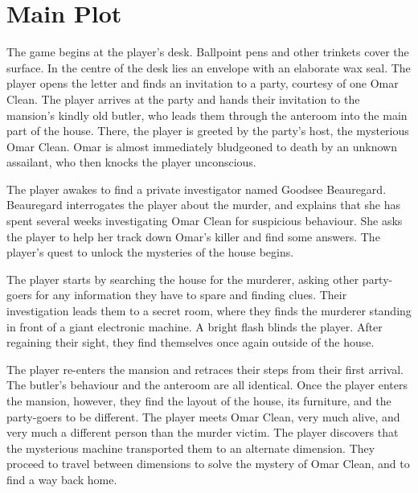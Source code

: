 \section{Main Plot}
\label{sec:mainplot}
The game begins at the player's desk. Ballpoint pens and other trinkets cover the surface. In the centre of the desk lies an envelope with an elaborate wax seal. The player opens the letter and finds an invitation to a party, courtesy of one Omar Clean. The player arrives at the party and hands their invitation to the mansion's kindly old butler, who leads them through the anteroom into the main part of the house. There, the player is greeted by the party's host, the mysterious Omar Clean. Omar is almost immediately bludgeoned to death by an unknown assailant, who then knocks the player unconscious.

The player awakes to find a private investigator named Goodsee Beauregard. Beauregard interrogates the player about the murder, and explains that she has spent several weeks investigating Omar Clean for suspicious behaviour. She asks the player to help her track down Omar's killer and find some answers. The player's quest to unlock the mysteries of the house begins.

The player starts by searching the house for the murderer, asking other party-goers for any information they have to spare and finding clues. Their investigation leads them to a secret room, where they finds the murderer standing in front of a giant electronic machine. A bright flash blinds the player. After regaining their sight, they find themselves once again outside of the house.

The player re-enters the mansion and retraces their steps from their first arrival. The butler's behaviour and the anteroom are all identical. Once the player enters the mansion, however, they find the layout of the house, its furniture, and the party-goers to be different. The player meets Omar Clean, very much alive, and very much a different person than the murder victim. The player discovers that the mysterious machine transported them to an alternate dimension. They proceed to travel between dimensions to solve the mystery of Omar Clean, and to find a way back home.

